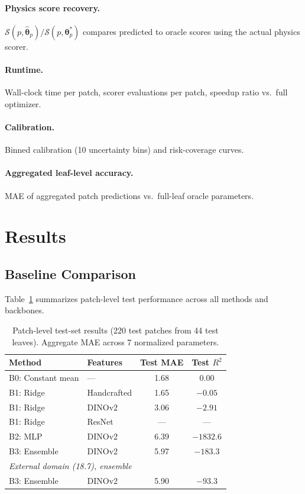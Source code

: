\documentclass[11pt,a4paper]{article}
\newcommand{\btheta}{\boldsymbol{\theta}}
\newcommand{\cS}{\mathcal{S}}
\begin{document}
\paragraph{Physics score recovery.}
$\cS(p, \hat{\btheta}_p) / \cS(p, \btheta^*_p)$ compares predicted
to oracle scores using the actual physics scorer.

\paragraph{Runtime.}
Wall-clock time per patch, scorer evaluations per patch,
speedup ratio vs.\ full optimizer.

\paragraph{Calibration.}
Binned calibration (10 uncertainty bins) and risk-coverage curves.

\paragraph{Aggregated leaf-level accuracy.}
MAE of aggregated patch predictions vs.\ full-leaf oracle parameters.

\section{Results}
\label{sec:results}

\subsection{Baseline Comparison}

Table~\ref{tab:baselines} summarizes patch-level test performance across
all methods and backbones.

\begin{table}[h]
\centering
\caption{Patch-level test-set results (220 test patches from 44 test leaves).
Aggregate MAE across 7 normalized parameters.}
\label{tab:baselines}
\begin{tabular}{llcc}
\toprule
Method & Features & Test MAE & Test $R^2$ \\
\midrule
B0: Constant mean     & ---         & 1.68  & $0.00$ \\
B1: Ridge             & Handcrafted & 1.65  & $-0.05$ \\
B1: Ridge             & DINOv2      & 3.06  & $-2.91$ \\
B1: Ridge             & ResNet      & ---   & ---    \\
B2: MLP               & DINOv2      & 6.39  & $-1832.6$ \\
B3: Ensemble          & DINOv2      & 5.97  & $-183.3$ \\
\midrule
\multicolumn{4}{l}{\emph{External domain (18.7), ensemble}} \\
B3: Ensemble          & DINOv2      & 5.90  & $-93.3$ \\
\bottomrule
\end{tabular}
\end{table}
\end{document}
